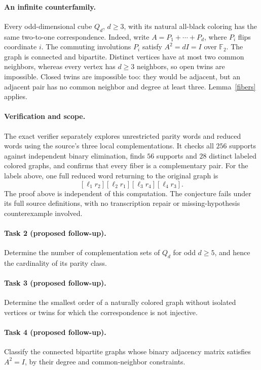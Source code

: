 \documentclass[11pt]{article}
\newcommand{\F}{\mathbb F_2}
\begin{document}
\paragraph{An infinite counterfamily.}
Every odd-dimensional cube \(Q_d\), \(d\ge3\), with its natural
all-black coloring has the same two-to-one correspondence.
Indeed, write \(A=P_1+\cdots+P_d\), where \(P_i\) flips coordinate
\(i\). The commuting involutions \(P_i\) satisfy
\(A^2=dI=I\) over \(\F\). The graph is connected and bipartite.
Distinct vertices have at most two common neighbors, whereas every
vertex has \(d\ge3\) neighbors, so open twins are impossible.
Closed twins are impossible too: they would be adjacent, but an
adjacent pair has no common neighbor and degree at least three.
Lemma~\ref{fibers} applies.

\paragraph{Verification and scope.}
The exact verifier separately explores unrestricted parity words and
reduced words using the source's three local complementations.
It checks all \(256\) supports against independent binary elimination,
finds \(56\) supports and \(28\) distinct labeled colored graphs,
and confirms that every fiber is a complementary pair.
For the labels above, one full reduced word returning to the original
graph is
\[
 [\ell_1r_2][\ell_2r_1][\ell_3r_4][\ell_4r_3].
\]
The proof above is independent of this computation.
The conjecture fails under its full source definitions, with no
transcription repair or missing-hypothesis counterexample involved.

\paragraph{Task 2 (proposed follow-up).}
Determine the number of complementation sets of \(Q_d\) for odd
\(d\ge5\), and hence the cardinality of its parity class.

\paragraph{Task 3 (proposed follow-up).}
Determine the smallest order of a naturally colored graph without
isolated vertices or twins for which the correspondence is not injective.

\paragraph{Task 4 (proposed follow-up).}
Classify the connected bipartite graphs whose binary adjacency matrix
satisfies \(A^2=I\), by their degree and common-neighbor constraints.
\end{document}
